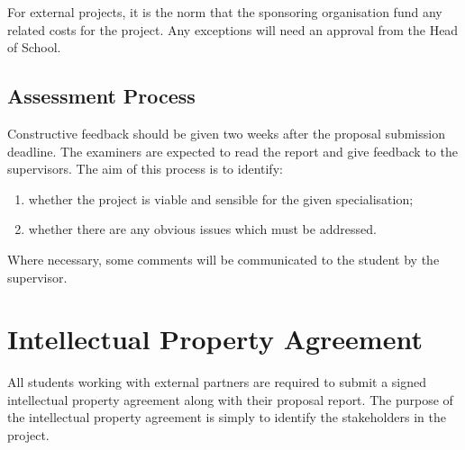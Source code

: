 For external projects, it is the norm that the sponsoring organisation fund any related costs for the project. Any exceptions will need an approval from the Head of School.

\subsection{Assessment Process}

Constructive feedback should be given two weeks after the proposal submission deadline.  
The examiners are expected to read the report and give feedback to the supervisors. The aim of this process is to identify:
\begin{enumerate}
    \item whether the project is viable and sensible for the given specialisation;
    \item whether there are any obvious issues which must be addressed.
\end{enumerate} 
Where necessary, some comments will be communicated
to the student by the supervisor.

\section{Intellectual Property Agreement}

All students working with external partners are required to submit a signed intellectual property agreement along with their {proposal report}.  The purpose of the intellectual property agreement is simply to identify the stakeholders in the project.
